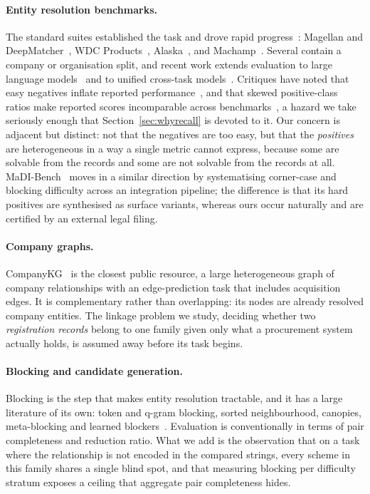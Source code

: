 \paragraph{Entity resolution benchmarks.} The standard suites established the task and
drove rapid progress~\citep{li2020ditto,zeakis2023pretrained}: Magellan and
DeepMatcher~\citep{konda2016magellan,mudgal2018deepmatcher}, WDC
Products~\citep{peeters2024wdcproducts}, Alaska~\citep{crescenzi2021alaska}, and
Machamp~\citep{wang2021machamp}. Several contain a company or organisation
split, and recent work extends evaluation to large language
models~\citep{peeters2023chatgpt,zhang2024jellyfish,peeters2025entitymatchingllm} and to
unified cross-task models~\citep{tu2023unicorn}. Critiques have noted that easy
negatives inflate reported
performance~\citep{papadakis2023benchmarking,neuhof2024openbenchmark}, and that skewed positive-class
ratios make reported scores incomparable across benchmarks~\citep{li2022bridging}, a
hazard we take seriously enough that Section~\ref{sec:whyrecall} is devoted to it. Our
concern is adjacent but distinct: not that the negatives are too easy, but that the
\emph{positives} are heterogeneous in a way a single metric cannot express, because some
are solvable from the records and some are not solvable from the records at all.
MaDI-Bench~\citep{steiner2026madibench} moves in a similar direction by systematising
corner-case and blocking difficulty across an integration pipeline; the difference is
that its hard positives are synthesised as surface variants, whereas ours occur naturally
and are certified by an external legal filing.

\paragraph{Company graphs.} CompanyKG~\citep{cao2023companykg} is the closest public
resource, a large heterogeneous graph of company relationships with an edge-prediction
task that includes acquisition edges. It is complementary rather than overlapping: its
nodes are already resolved company entities. The linkage problem we study, deciding
whether two \emph{registration records} belong to one family given only what a
procurement system actually holds, is assumed away before its task begins.

\paragraph{Blocking and candidate generation.} Blocking is the step that makes entity
resolution tractable, and it has a large literature of its own: token and q-gram
blocking, sorted neighbourhood, canopies, meta-blocking and learned
blockers~\citep{papadakis2021fourgenerations,thirumuruganathan2021blocking}. Evaluation is
conventionally in terms of pair completeness and reduction ratio. What we add is the
observation that on a task where the relationship is not encoded in the compared
strings, every scheme in this family shares a single blind spot, and that measuring
blocking per difficulty stratum exposes a ceiling that aggregate pair completeness
hides.

